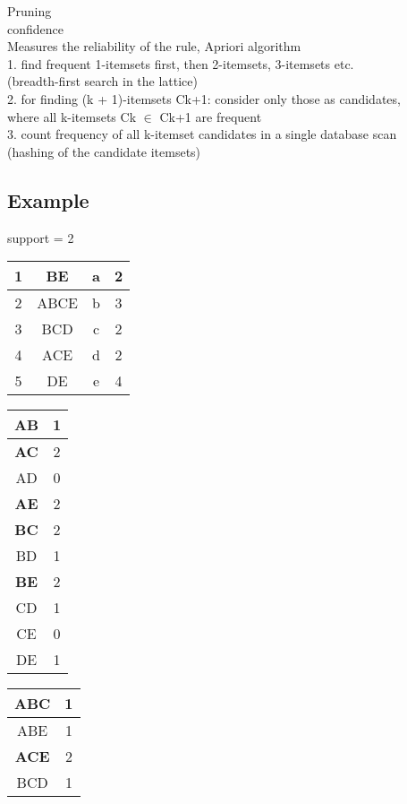 \documentclass[a4paper,10pt,titlepage]{report}
\begin{document}
Pruning\\
confidence \\
\hspace{10mm}	Measures the reliability of the rule,
\vspace{10mm}
		Apriori algorithm\\
\hspace{5mm}			1. find frequent 1-itemsets first, then 2-itemsets, 	3-itemsets etc. \\
\hspace{15mm} (breadth-first search in the lattice)\\
\hspace{5mm}			2. for finding (k + 1)-itemsets Ck+1: consider only those as candidates,
\\ \hspace{15mm} where all k-itemsets Ck $ \in $ Ck+1 are frequent\\
\hspace{5mm}			3. count frequency of all k-itemset candidates in a single	database scan \\ \hspace{15mm} (hashing of the candidate itemsets)\\

\subsection{Example}
support = 2 \\
\begin{tabular}{|c|c||c|c|}
 \hline 
 1 & BE & a & 2 \\ 
 \hline 
 2 & ABCE & b & 3 \\ 
 \hline 
 3 & BCD & c & 2 \\ 
 \hline 
 4 & ACE & d & 2 \\ 
 \hline 
 5 & DE & e & 4 \\ 
 \hline 
 \end{tabular}  
\begin{tabular}{|c|c|}
\hline 
AB & 1 \\ 
\hline 
\textbf{AC} & 2 \\ 
\hline 
AD & 0 \\ 
\hline 
\textbf{AE} & 2 \\ 
\hline 
\textbf{BC} & 2 \\ 
\hline 
BD & 1 \\ 
\hline 
\textbf{BE} & 2 \\ 
\hline 
CD & 1 \\ 
\hline 
CE & 0 \\ 
\hline 
DE & 1 \\ 
\hline 
\end{tabular} 
\begin{tabular}{|c|c|}
\hline 
ABC & 1 \\ 
\hline 
ABE & 1 \\ 
\hline 
\textbf{ACE} & 2 \\ 
\hline 
BCD & 1 \\ 
\hline 
\end{tabular} 
\end{document}
